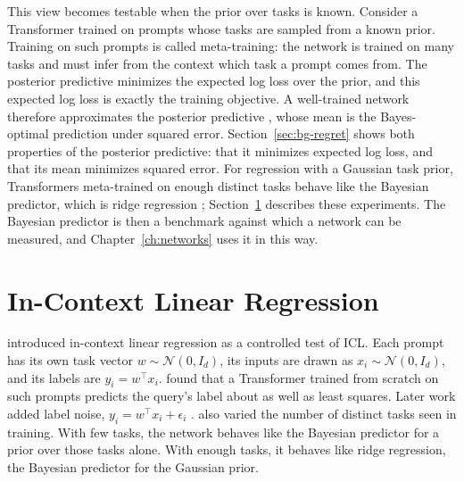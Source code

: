 This view becomes testable when the prior over tasks is known. Consider a Transformer trained on prompts whose tasks are sampled from a known prior. Training on such prompts is called meta-training: the network is trained on many tasks and must infer from the context which task a prompt comes from. The posterior predictive minimizes the expected log loss over the prior, and this expected log loss is exactly the training objective. A well-trained network therefore approximates the posterior predictive \citep{muller2022}, whose mean is the Bayes-optimal prediction under squared error. Section~\ref{sec:bg-regret} shows both properties of the posterior predictive: that it minimizes expected log loss, and that its mean minimizes squared error. For regression with a Gaussian task prior, Transformers meta-trained on enough distinct tasks behave like the Bayesian predictor, which is ridge regression \citep{akyurek2023, raventos2023, panwar2024}; Section~\ref{sec:bg-linreg} describes these experiments. The Bayesian predictor is then a benchmark against which a network can be measured, and Chapter~\ref{ch:networks} uses it in this way.

\section{In-Context Linear Regression}\label{sec:bg-linreg}
\citet{garg2022} introduced in-context linear regression as a controlled test of ICL. Each prompt has its own task vector $w \sim \mathcal{N}(0, I_d)$, its inputs are drawn as $x_i \sim \mathcal{N}(0, I_d)$, and its labels are $y_i = w^\top x_i$. \citet{garg2022} found that a Transformer trained from scratch on such prompts predicts the query's label about as well as least squares. Later work added label noise, $y_i = w^\top x_i + \epsilon_i$ \citep{akyurek2023, raventos2023}. \citet{raventos2023} also varied the number of distinct tasks seen in training. With few tasks, the network behaves like the Bayesian predictor for a prior over those tasks alone. With enough tasks, it behaves like ridge regression, the Bayesian predictor for the Gaussian prior.

